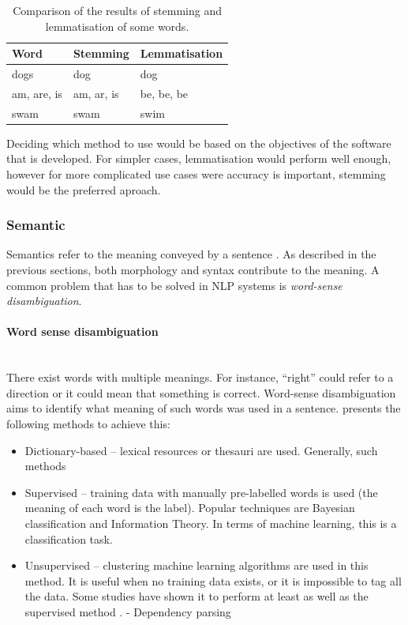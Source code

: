 \documentclass[12pt,a4paper]{article}
\newcommand{\myparagraph}[1]{\paragraph{#1}\mbox{}\\}
\newcommand{\captionstyle}[1] {
    \small{#1}
}
\begin{document}
\begin{table}[htb]
	\renewcommand\arraystretch{1.6}
	\caption{\captionstyle{Comparison of the results of stemming and lemmatisation of some words.}}
	\label{tbl:stemlem}
	\begin{tabularx}{\textwidth}{XXX}
		\toprule
		\textbf{Word} & \textbf{Stemming} & \textbf{Lemmatisation} \\ \midrule
		dogs          & dog                      & dog                           \\
		am, are, is   & am, ar, is               & be, be, be                    \\
		swam          & swam                     & swim                          \\ \bottomrule
	\end{tabularx}
\end{table}

Deciding which method to use would be based on the objectives of the software that is developed. For simpler cases, lemmatisation would perform well enough, however for more complicated use cases were accuracy is important, stemming would be the preferred aproach.

\subsubsection{Semantic}
Semantics refer to the meaning conveyed by a sentence \citep{Martinez2010}. As described in the previous sections, both morphology and syntax contribute to the meaning. A common problem that has to be solved in NLP systems is \textit{word-sense disambiguation}.

\myparagraph{Word sense disambiguation}
There exist words with multiple meanings. For instance, “right” could refer to a direction or it could mean that something is correct. Word-sense disambiguation aims to identify what meaning of such words was used in a sentence. \citet{Martinez2010} presents the following methods to achieve this:

\begin{itemize}
	\item Dictionary-based – lexical resources or thesauri are used. Generally, such methods 
	\item Supervised – training data with manually pre-labelled words is used (the meaning of each word is the label). Popular techniques are Bayesian classification and Information Theory. In terms of machine learning, this is a classification task.
	\item Unsupervised – clustering machine learning algorithms are used in this method. It is useful when no training data exists, or it is impossible to tag all the data. Some studies have shown it to perform at least as well as the supervised method \citep{Yarowsky1995}.
	-	Dependency parsing
\end{itemize}
	
\end{document}
